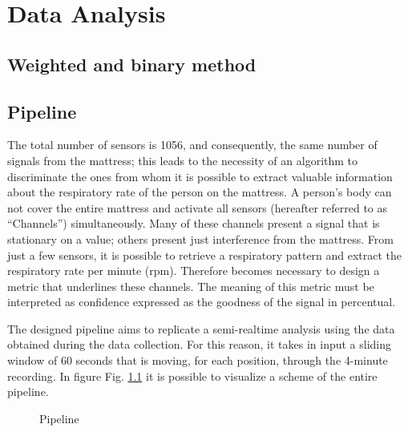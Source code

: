\chapter{Data Analysis}
\section{Weighted and binary method}
\section{Pipeline}
The total number of sensors is 1056, and consequently, the same number of signals from the mattress; this leads to the necessity of an algorithm to discriminate the ones from whom it is possible to extract valuable information about the respiratory rate of the person on the mattress. A person's body can not cover the entire mattress and activate all sensors (hereafter referred to as “Channels”) simultaneously.
Many of these channels present a signal that is stationary on a value; others present just interference from the mattress. From just a few sensors, it is possible to retrieve a respiratory pattern and extract the respiratory rate per minute (rpm). Therefore becomes necessary to design a metric that underlines these channels. The meaning of this metric must be interpreted as confidence expressed as the goodness of the signal in percentual.

The designed pipeline aims to replicate a semi-realtime analysis using the data obtained during the data collection. 
For this reason, it takes in input a sliding window of 60 seconds that is moving, for each position, through the 4-minute recording.
In figure Fig. \ref{diag:pipeline} it is possible to visualize a scheme of the entire pipeline.\\



\vspace*{1.0cm}

\begin{figure}[H]
    \begin{center}
    \end{center}
    \caption{Pipeline}
    \label{diag:pipeline}
\end{figure}
\vspace*{1.0cm}
